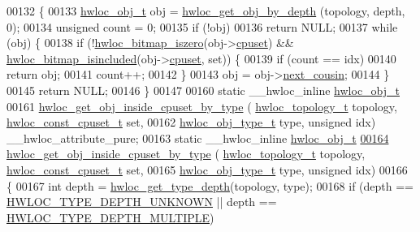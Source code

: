\begin{DoxyCode}
00132 \{
00133   \hyperlink{a00238}{hwloc\_obj\_t} obj = \hyperlink{a00187_ga391f6b2613f0065673eaa4069b93d4e0}{hwloc\_get\_obj\_by\_depth} (topology, depth, 0);
00134   \textcolor{keywordtype}{unsigned} count = 0;
00135   \textcolor{keywordflow}{if} (!obj)
00136     \textcolor{keywordflow}{return} NULL;
00137   \textcolor{keywordflow}{while} (obj) \{
00138     \textcolor{keywordflow}{if} (!\hyperlink{a00205_ga5b64be28f5a7176ed8ad0d6a90bdf108}{hwloc\_bitmap\_iszero}(obj->\hyperlink{a00238_a67925e0f2c47f50408fbdb9bddd0790f}{cpuset}) && 
      \hyperlink{a00205_ga0526e03db81956fb02acc8260b66d6a4}{hwloc\_bitmap\_isincluded}(obj->\hyperlink{a00238_a67925e0f2c47f50408fbdb9bddd0790f}{cpuset}, \textcolor{keyword}{set})) \{
00139       \textcolor{keywordflow}{if} (count == idx)
00140         \textcolor{keywordflow}{return} obj;
00141       count++;
00142     \}
00143     obj = obj->\hyperlink{a00238_a85a788017457129589318b6c39451acf}{next\_cousin};
00144   \}
00145   \textcolor{keywordflow}{return} NULL;
00146 \}
00147 
00160 \textcolor{keyword}{static} \_\_hwloc\_inline \hyperlink{a00238}{hwloc\_obj\_t}
00161 \hyperlink{a00195_ga2edf924e5a0cca9cb22f65cc77c6ddb5}{hwloc\_get\_obj\_inside\_cpuset\_by\_type} (
      \hyperlink{a00186_ga9d1e76ee15a7dee158b786c30b6a6e38}{hwloc\_topology\_t} topology, \hyperlink{a00183_ga1f784433e9b606261f62d1134f6a3b25}{hwloc\_const\_cpuset\_t} \textcolor{keyword}{set},
00162                                      \hyperlink{a00184_gacd37bb612667dc437d66bfb175a8dc55}{hwloc\_obj\_type\_t} type, \textcolor{keywordtype}{unsigned} idx) 
      \_\_hwloc\_attribute\_pure;
00163 \textcolor{keyword}{static} \_\_hwloc\_inline \hyperlink{a00238}{hwloc\_obj\_t}
\hyperlink{a00195_ga2edf924e5a0cca9cb22f65cc77c6ddb5}{00164} \hyperlink{a00195_ga2edf924e5a0cca9cb22f65cc77c6ddb5}{hwloc\_get\_obj\_inside\_cpuset\_by\_type} (
      \hyperlink{a00186_ga9d1e76ee15a7dee158b786c30b6a6e38}{hwloc\_topology\_t} topology, \hyperlink{a00183_ga1f784433e9b606261f62d1134f6a3b25}{hwloc\_const\_cpuset\_t} \textcolor{keyword}{set},
00165                                      \hyperlink{a00184_gacd37bb612667dc437d66bfb175a8dc55}{hwloc\_obj\_type\_t} type, \textcolor{keywordtype}{unsigned} idx)
00166 \{
00167   \textcolor{keywordtype}{int} depth = \hyperlink{a00187_ga8bec782e21be313750da70cf7428b374}{hwloc\_get\_type\_depth}(topology, type);
00168   \textcolor{keywordflow}{if} (depth == \hyperlink{a00187_ggaf4e663cf42bbe20756b849c6293ef575a0565ab92ab72cb0cec91e23003294aad}{HWLOC\_TYPE\_DEPTH\_UNKNOWN} || depth == 
      \hyperlink{a00187_ggaf4e663cf42bbe20756b849c6293ef575ae99465995cacde6c210d5fc2e409798c}{HWLOC\_TYPE\_DEPTH\_MULTIPLE})

\end{DoxyCode}
